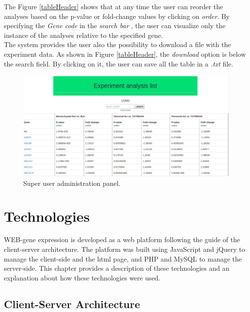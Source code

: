 \documentclass[a4paper]{report}
\begin{document}
The Figure \ref{tableHeader} shows that at any time the user can reorder the analyses based on the p-value or fold-change values by clicking on \emph{order}. By specifying the \emph{Gene code} in the \emph{search bar} , the user can visualize only the instance of the analyses relative to the specified gene.\\
The system provides the user also the possibility to download a file with the experiment data. As shown in Figure \ref{tableHeader}, the \emph{download} option is below the search field. By clicking on it, the user can save all the table in a \emph{.txt} file.


\begin{figure}[htb] 
\begin{center}
\includegraphics[scale=0.4]{figure/table.jpg} 
\end{center}
\caption{Super user administration panel.}
\label{table}
\end{figure}


\chapter{Technologies}
WEB-gene expression is developed as a web platform following the guide of the client-server architecture. The platform was built using JavaScript and jQuery to manage the client-side and the html page, and PHP and MySQL to manage the server-side. This chapter provides a description of these technologies and an explanation about how these technologies were used.

\section{Client-Server Architecture}
\end{document}
